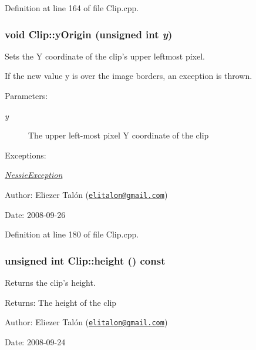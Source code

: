 Definition at line 164 of file Clip.cpp.\hypertarget{class_clip_6b0100fdd089be816b97465df4dd2846}{
\subsubsection[yOrigin]{\setlength{\rightskip}{0pt plus 5cm}void Clip::yOrigin (unsigned int {\em y})}}
\label{class_clip_6b0100fdd089be816b97465df4dd2846}


Sets the Y coordinate of the clip's upper leftmost pixel. 

If the new value y is over the image borders, an exception is thrown.

\begin{Desc}
\item[Parameters:]
\begin{description}
\item[{\em y}]The upper left-most pixel Y coordinate of the clip\end{description}
\end{Desc}
\begin{Desc}
\item[Exceptions:]
\begin{description}
\item[{\em \hyperlink{class_nessie_exception}{NessieException}}]\end{description}
\end{Desc}
\begin{Desc}
\item[Author:]Eliezer Talón (\href{mailto:elitalon@gmail.com}{\tt elitalon@gmail.com}) \end{Desc}
\begin{Desc}
\item[Date:]2008-09-26 \end{Desc}


Definition at line 180 of file Clip.cpp.\hypertarget{class_clip_393710a6b136f400dd5c900f8831e1a8}{
\subsubsection[height]{\setlength{\rightskip}{0pt plus 5cm}unsigned int Clip::height () const}}
\label{class_clip_393710a6b136f400dd5c900f8831e1a8}


Returns the clip's height. 

\begin{Desc}
\item[Returns:]The height of the clip\end{Desc}
\begin{Desc}
\item[Author:]Eliezer Talón (\href{mailto:elitalon@gmail.com}{\tt elitalon@gmail.com}) \end{Desc}
\begin{Desc}
\item[Date:]2008-09-24 \end{Desc}


